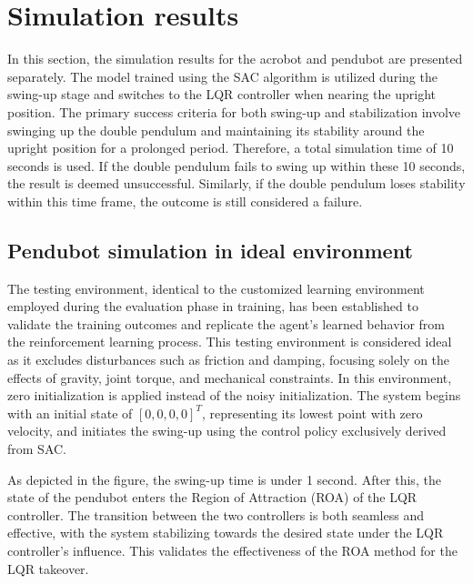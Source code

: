 
\section{Simulation results}
In this section, the simulation results for the acrobot and pendubot are presented separately. The model trained using the SAC algorithm is utilized during the swing-up stage and switches to the LQR controller when nearing the upright position. The primary success criteria for both swing-up and stabilization involve swinging up the double pendulum and maintaining its stability around the upright position for a prolonged period. Therefore, a total simulation time of 10 seconds is used. If the double pendulum fails to swing up within these 10 seconds, the result is deemed unsuccessful. Similarly, if the double pendulum loses stability within this time frame, the outcome is still considered a failure.

\subsection{Pendubot simulation in ideal environment}
The testing environment, identical to the customized learning environment employed during the evaluation phase in training, has been established to validate the training outcomes and replicate the agent's learned behavior from the reinforcement learning process. This testing environment is considered ideal as it excludes disturbances such as friction and damping, focusing solely on the effects of gravity, joint torque, and mechanical constraints. In this environment, zero initialization is applied instead of the noisy initialization. The system begins with an initial state of \([0,0,0,0]^T\), representing its lowest point with zero velocity, and initiates the swing-up using the control policy exclusively derived from SAC.

As depicted in the figure, the swing-up time is under 1 second. After this, the state of the pendubot enters the Region of Attraction (ROA) of the LQR controller. The transition between the two controllers is both seamless and effective, with the system stabilizing towards the desired state under the LQR controller's influence. This validates the effectiveness of the ROA method for the LQR takeover.

